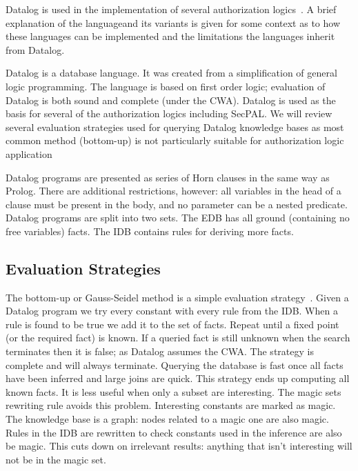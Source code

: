 \documentclass[thesis.tex]{subfiles}
\begin{document}

Datalog is used in the implementation of several authorization
logics~\cite{detreville_binder_2002,li_distributed_2003,becker_secpal:_2010}. A brief explanation of the languageand its variants is given for some context as to how these languages
can be implemented and the limitations the languages inherit from
Datalog.

Datalog is a database language. It was created from a simplification
of general logic programming. The language is based on first order
logic; evaluation of Datalog is both sound and complete (under the
\ac{CWA}). Datalog is used as the basis for several of the
authorization logics including SecPAL. We will review several
evaluation strategies used for querying Datalog knowledge bases as
most common method (bottom-up) is not particularly suitable for
authorization logic application

Datalog programs are presented as series of Horn clauses in the same
way as Prolog. There are additional restrictions, however: all
variables in the head of a clause must be present in the body, and no
parameter can be a nested predicate.  Datalog programs are split into
two sets. The \ac{EDB} has all ground (containing no free variables)
facts. The \ac{IDB} contains rules for deriving more facts.

\subsection{Evaluation Strategies}

The bottom-up or Gauss-Seidel method is a simple evaluation
strategy~\cite{ceri_what_1989}. Given a Datalog program we try every
constant with every rule from the IDB. When a rule is found to be true
we add it to the set of facts. Repeat until a fixed point (or the
required fact) is known. If a queried fact is still unknown when the
search terminates then it is false; as Datalog assumes the CWA. The
strategy is complete and will always terminate.  Querying the database
is fast once all facts have been inferred and large joins are quick.
This strategy ends up computing all known facts. It is less useful
when only a subset are interesting. The magic
sets~\cite{bancilhon_magic_1986} rewriting rule avoids this
problem. Interesting constants are marked as magic. The knowledge base
is a graph: nodes related to a magic one are also magic. Rules in the
IDB are rewritten to check constants used in the inference are also be
magic. This cuts down on irrelevant results: anything that isn't
interesting will not be in the magic set.
\end{document}
